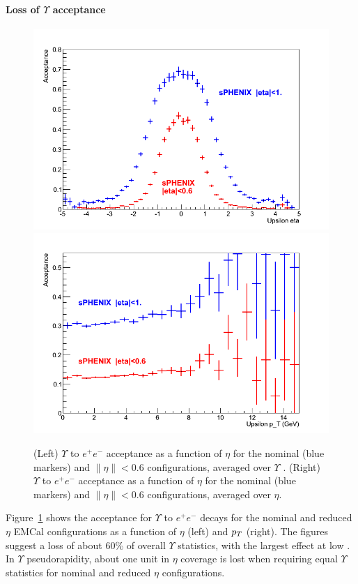\paragraph{Loss of $\Upsilon$ acceptance}
\begin{figure}[hbt]
  \centering
  \includegraphics[width=0.4\linewidth]{figs/upsilon_rate_eta}
  \hspace{0.1\linewidth}
  \includegraphics[width=0.4\linewidth]{figs/upsilon_rate_pT}
  \caption{(Left)
  $\Upsilon$ to $e^+ e^-$ acceptance as a function of $\eta$ for the nominal (blue markers) and $\| \eta \| < 0.6$ configurations,
  averaged over $\Upsilon$ \pt. 
  (Right) $\Upsilon$ to $e^+ e^-$ acceptance as a function of $\eta$ for the nominal (blue markers) and $\| \eta \| < 0.6$ 
  configurations, averaged over $\eta$.}
  \label{fig:upsilon_rate}
\end{figure}

Figure~\ref{fig:upsilon_rate} shows the acceptance for $\Upsilon$ to $e^+ e^-$ decays for the nominal and reduced $\eta$ EMCal
configurations as a function of $\eta$ (left) and $\mbox{${p_T}$}$ (right). The figures suggest a loss of about 60\% of overall 
$\Upsilon$ statistics, with the largest effect at low \pt. In $\Upsilon$ pseudorapidity, about one unit in $\eta$ coverage is 
lost when requiring equal $\Upsilon$ statistics for nominal and reduced $\eta$ configurations.

